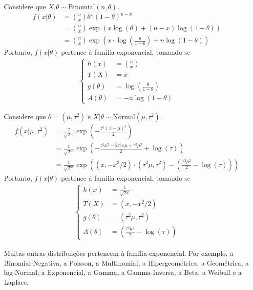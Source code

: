 \begin{example}
 \label{example:exponential_family_binomial}
 Considere que $X|\theta \sim \text{Binomial}(n,\theta)$.
 \begin{align*}
  f(x|\theta)
  &= {n \choose x}\theta^{x}(1-\theta)^{n-x} \\
  &= {n \choose x}\exp\left(x\log(\theta)
  +(n-x)\log(1-\theta)\right) \\
  &= {n \choose x}\exp\left(x \cdot \log\left(\frac{\theta}{1-\theta}\right) +n\log(1-\theta)\right)
 \end{align*}
 Portanto, $f(x|\theta)$ pertence à
 família exponencial, tomando-se 
 \begin{align*}
  \begin{cases}
   h(x) &= {n \choose x} \\
   T(X) &= x \\
   g(\theta) 
   &= \log\left(\frac{\theta}{1-\theta}\right) \\
   A(\theta) &= -n\log(1-\theta)
  \end{cases}
 \end{align*}
\end{example}

\begin{example}
 Considere que $\theta=(\mu,\tau^{2})$ e
 $X|\theta \sim \text{Normal}(\mu,\tau^{2})$.
 \begin{align*}
  f(x|\mu,\tau^{2})
  &= \frac{\tau}{\sqrt{2\pi}}\exp\left(-\frac{\tau^{2}(x-\mu)^{2}}{2}\right) \\
  &= \frac{1}{\sqrt{2\pi}}\exp\left(-\frac{\tau^{2}x^{2}-2\tau^{2}x\mu +\tau^{2}\mu^{2}}{2} +\log(\tau)\right) \\
  &= \frac{1}{\sqrt{2\pi}}\exp\left((x,-x^{2}/2) \cdot (\tau^{2}\mu, \tau^{2}) -\left(\frac{\tau^{2}\mu^{2}}{2}-\log(\tau)\right)\right)
 \end{align*}
 Portanto, $f(x|\theta)$ pertence à
 família exponencial, tomando-se 
 \begin{align*}
  \begin{cases}
   h(x) &= \frac{1}{\sqrt{2\pi}} \\
   T(X) &= (x,-x^{2}/2) \\
   g(\theta) &= (\tau^{2}\mu, \tau^{2}) \\
   A(\theta) &= \left(\frac{\tau^{2}\mu^{2}}{2}
   -\log(\tau)\right)
  \end{cases}
 \end{align*}
\end{example}

Muitas outras distribuições pertencem à
família exponencial. Por exemplo, a Binomial-Negativa,
a Poisson, a Multinomial, a Hipergeométrica,
a Geométrica, a log-Normal, a Exponencial,
a Gamma, a Gamma-Inversa, a Beta, a Weibull e a Laplace.

